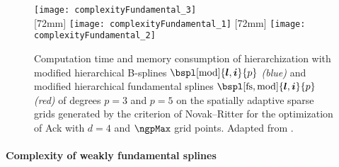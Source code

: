 \begin{figure}
  \texttt{[image: complexityFundamental\_3]}\\[2mm]%
  [72mm]{%
    \texttt{[image: complexityFundamental\_1]}%
  }%
  \hfill%
  [72mm]{%
    \texttt{[image: complexityFundamental\_2]}%
  }%
  \caption[Complexity of fundamental splines]{%
    Computation time and memory consumption of hierarchization
    with modified hierarchical B-splines
    $\bspl[\modified]{\*l,\*i}{p}$ \emph{\textcolor{C0}{(blue)}} and
    \vspace*{-0.3em}%
    modified hierarchical fundamental splines
    $\bspl[\fs,\modified]{\*l,\*i}{p}$ \emph{\textcolor{C1}{(red)}}
    of degrees $p = 3$ and $p = 5$
    on the spatially adaptive sparse grids generated by the criterion of
    Novak--Ritter for the optimization of Ack with $d = 4$ and
    $\ngpMax$ grid points.
    Adapted from \cite{Valentin18Fundamental}.%
  }%
  \label{fig:complexityFundamental}%
\end{figure}

\paragraph{Complexity of weakly fundamental splines}


